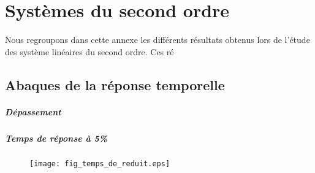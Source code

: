 \chapter{Systèmes du second ordre\label{annexe-2nd}}
Nous regroupons dans cette annexe les différents résultats obtenus lors de 
l'étude des système linéaires du second ordre. Ces ré
\newpage
\section{Abaques de la réponse temporelle}

\paragraph{Dépassement}
\begin{figure}[!h]
\begin{center}
        
\end{center}
\end{figure}

\paragraph{Temps de réponse à 5\%}
\begin{figure}[!hb]
    \centering
    \texttt{[image: fig\_temps\_de\_reduit.eps]}
\end{figure}

